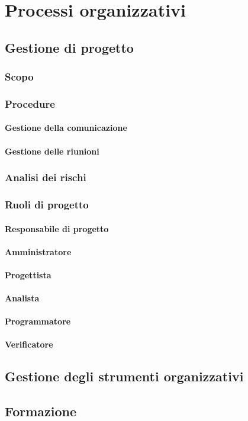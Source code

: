 \section{Processi organizzativi}
\subsection{Gestione di progetto}
\subsubsection{Scopo}

\subsubsection{Procedure}

\paragraph{Gestione della comunicazione}

\paragraph{Gestione delle riunioni}

\subsubsection{Analisi dei rischi}

\subsubsection{Ruoli di progetto}

\paragraph{Responsabile di progetto} 

\paragraph{Amministratore} 

\paragraph{Progettista} 

\paragraph{Analista} 

\paragraph{Programmatore} 

\paragraph{Verificatore} 

\subsection{Gestione degli strumenti organizzativi}

\subsection{Formazione}
